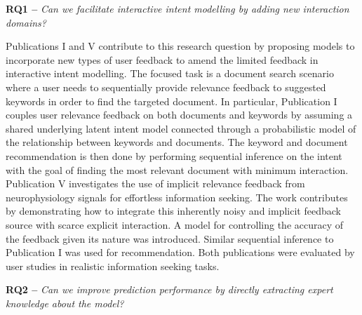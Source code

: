 \documentclass[dissertation,math,vertlayout,pdfa,colorlinks]{aaltoseries}
\begin{document}
\noindent \textbf{RQ1 --} \textit{Can we facilitate interactive intent modelling by adding new interaction domains?}

Publications I and V contribute to this research question by proposing models to incorporate new types of user feedback to amend the limited feedback in interactive intent modelling. The focused task is a document search scenario where a user needs to sequentially provide relevance feedback to suggested keywords in order to find the targeted document. %
In particular, Publication I couples user relevance feedback on both documents and keywords by assuming a shared underlying latent intent model connected through a probabilistic model of the relationship between keywords and documents. The keyword and document recommendation is then done by performing sequential inference on the intent with the goal of finding the most relevant document with minimum interaction.
Publication V investigates the use of implicit relevance feedback from neurophysiology signals for effortless information seeking. The work contributes by demonstrating how to integrate this inherently noisy and implicit feedback source with scarce explicit interaction. A model for controlling the accuracy of the feedback given its nature %
was introduced. 
Similar sequential inference to Publication I was used for recommendation. 
Both publications were evaluated by user studies in realistic information seeking tasks. 


\noindent \textbf{RQ2 --} \textit{Can we improve prediction performance by directly extracting expert knowledge about the model?}
\end{document}
